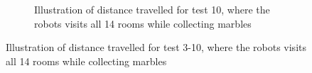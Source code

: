 \documentclass[../Head/Main.tex]{subfiles}
\begin{document}
\begin{figure}[H]
\begin{subfigure}[b]{0.49\textwidth}
    \caption{Illustration of distance travelled for test 10, where the robots visits all 14 rooms while collecting marbles}
    \label{fig:Marble10}
  \end{subfigure}
  \caption{Illustration of distance travelled for test 3-10, where the robots visits all 14 rooms while collecting marbles}
\end{figure}
\end{document}
